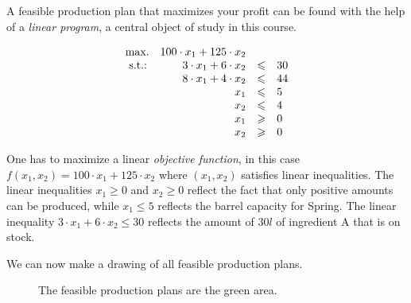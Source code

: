 A feasible production plan that maximizes your profit can be found
with the help of a \emph{linear program}, a central object of study in
this course.

  \begin{equation}\label{eq:1-4}
  \begin{array}[]{l rcl}
    \text{max.} & 100\cdot x_1 + 125 \cdot x_2 \\
    \text{ s.t.:} &  3\cdot x_1 + 6 \cdot x_2 & \leq & 30 \\
    &    8\cdot x_1 + 4 \cdot x_2 & \leq & 44 \\
    & x_1 & \leq & 5\\
    & x_2 & \leq & 4\\
     & x_1 & \geq & 0\\
    & x_2 & \geq & 0\\
  \end{array}
\end{equation}

One has to maximize a linear \emph{objective function}, in this case
$f(x_1,x_2) = 100\cdot x_1 + 125 \cdot x_2$ where $(x_1,x_2)$
satisfies linear inequalities. The linear inequalities $x_1\geq 0$ and
$x_2 \geq 0$ reflect the fact that only positive amounts can be
produced, while $x_1 \leq 5$ reflects the barrel capacity for
Spring. The linear inequality $3\cdot x_1 + 6 \cdot x_2 \leq 30$
reflects the amount of $30l$ of ingredient A that is on stock.

We can now make a drawing of all feasible production plans. 


\begin{figure}
  \centering
  

  \caption{The feasible production plans are the green area. }
  \label{fig:2}
\end{figure}


